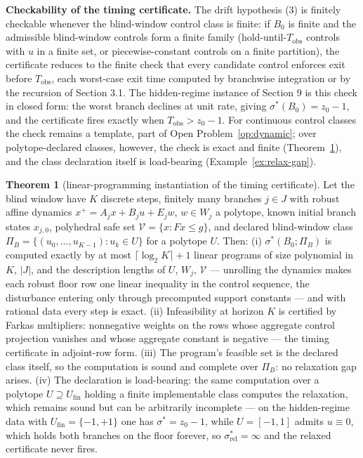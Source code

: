 \documentclass[10pt,twocolumn]{article}
\theoremstyle{definition}
\newtheorem{theorem}{Theorem}
\begin{document}
\textbf{Checkability of the timing certificate.} The drift hypothesis (3) is finitely checkable whenever the blind-window control class is finite: if \(B_{0}\) is finite and the admissible blind-window controls form a finite family (hold-until-\(T_{\mathrm{obs}}\) controls with \(u\) in a finite set, or piecewise-constant controls on a finite partition), the certificate reduces to the finite check that every candidate control enforces exit before \(T_{\mathrm{obs}}\), each worst-case exit time computed by branchwise integration or by the recursion of Section 3.1. The hidden-regime instance of Section 9 is this check in closed form: the worst branch declines at unit rate, giving \(\sigma^{*}(B_{0}) = z_{0} - 1\), and the certificate fires exactly when \(T_{\mathrm{obs}} > z_{0} - 1\). For continuous control classes the check remains a template, part of
Open Problem~\ref{op:dynamic}; over polytope-declared classes, however, the
check is exact and finite (Theorem~\ref{thm:lp-instant}), and the class
declaration itself is load-bearing (Example~\ref{ex:relax-gap}).

\begin{theorem}[linear-programming instantiation of the timing certificate]\label{thm:lp-instant}
Let the blind window have \(K\) discrete steps, finitely many branches \(j \in J\) with
robust affine dynamics \(x^{+} = A_{j} x + B_{j} u + E_{j} w\), \(w \in W_{j}\) a polytope,
known initial branch states \(x_{j,0}\), polyhedral safe set \(\mathcal{V} = \{x : Fx \le g\}\),
and declared blind-window class \(\Pi_{B} = \{(u_{0},\dots,u_{K-1}) : u_{k} \in U\}\) for a
polytope \(U\). Then: (i) \(\sigma^{*}(B_{0}; \Pi_{B})\) is computed exactly by at most
\(\lceil \log_{2} K \rceil + 1\) linear programs of size polynomial in \(K\), \(|J|\), and the
description lengths of \(U\), \(W_{j}\), \(\mathcal{V}\) --- unrolling the dynamics makes each
robust floor row one linear inequality in the control sequence, the disturbance entering only
through precomputed support constants --- and with rational data every step is exact.
(ii) Infeasibility at horizon \(K\) is certified by Farkas multipliers: nonnegative weights on
the rows whose aggregate control projection vanishes and whose aggregate constant is negative
--- the timing certificate in adjoint-row form. (iii) The program's feasible set is the
declared class itself, so the computation is sound and complete over \(\Pi_{B}\): no relaxation
gap arises. (iv) The declaration is load-bearing: the same computation over a polytope
\(U \supseteq U_{\mathrm{fin}}\) holding a finite implementable class computes the relaxation,
which remains sound but can be arbitrarily incomplete --- on the hidden-regime data with
\(U_{\mathrm{fin}} = \{-1, +1\}\) one has \(\sigma^{*} = z_{0} - 1\), while \(U = [-1,1]\)
admits \(u \equiv 0\), which holds both branches on the floor forever, so
\(\sigma^{*}_{\mathrm{rel}} = \infty\) and the relaxed certificate never fires.
\end{theorem}
\end{document}
